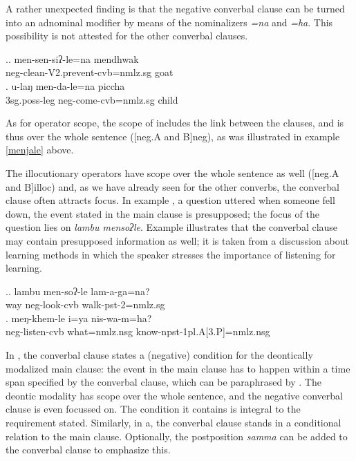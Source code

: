 	
A rather unexpected finding is that the negative converbal clause can be turned into an adnominal modifier by means of the nominalizers \emph{=na} and \emph{=ha}. This possibility is not attested for the other converbal clauses.

\ex.\ag. men-sen-siʔ-le=na    mendhwak\\
{\sc neg-}clean{\sc -V2.prevent-cvb=nmlz.sg} goat\\
 
 \bg. u-laŋ men-da-le=na piccha\\ 
	{\sc 3sg.poss}-leg {\sc neg-}come-{\sc cvb=nmlz.sg} child\\ 
	
As for operator scope, the scope of  includes the link between the clauses, and is thus over the whole sentence  ([neg.A and B]{\sc neg}), as was illustrated in example \ref{menjale} above. 


The illocutionary operators have scope over the whole sentence as well ([neg.A and B]{\sc illoc}) and, as we have already seen for the other converbs, the converbal clause often attracts focus. In example \Next[a], a question uttered when someone fell down, the event stated in the main clause is presupposed; the focus of the question lies on \emph{lambu mensoʔle}. Example \Next[b] illustrates that the converbal clause may contain presupposed information as well; it is taken from a discussion about learning methods in which the speaker stresses the importance of listening for learning.

	\ex.\ag. lambu men-soʔ-le lam-a-ga=na?\\
		way   {\sc neg-}look{\sc -cvb} walk{\sc -pst-2=nmlz.sg}\\
	\bg.	meŋ-khem-le i=ya nis-wa-m=ha?\\
			{\sc neg}-listen-{\sc cvb} what{\sc =nmlz.nsg} know{\sc -npst-1pl.A[3.P]=nmlz.nsg}\\
	

In \Next[a], the converbal clause states a (negative) condition for the deontically modalized main clause: the event in the main clause has to happen within a time span specified by the converbal clause, which can be paraphrased by . The deontic modality has scope over the whole sentence, and the negative converbal clause is even focussed on. The condition it contains is integral to the requirement stated. Similarly, in \Next[b] a, the  converbal clause stands in a conditional relation to the main clause. Optionally, the  postposition \emph{samma}  can be added to the converbal clause to emphasize this. 

